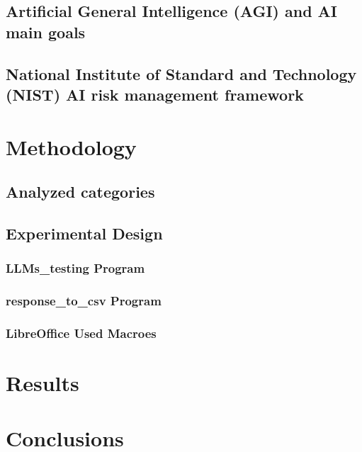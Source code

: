 \documentclass[12pt]{article}
\begin{document}
    \subsection{Artificial General Intelligence (AGI) and AI main goals}
    
    \subsection{National Institute of Standard and Technology (NIST) AI risk management framework}

\clearpage
\section{Methodology}
    \subsection{Analyzed categories}
    \subsection{Experimental Design}
        \subsubsection{LLMs\_testing Program}
        \subsubsection{response\_to\_csv Program}
        \subsubsection{LibreOffice Used Macroes}
        
\clearpage
\section{Results}

\clearpage
\section{Conclusions}

\clearpage
\printbibliography
\clearpage
\end{document}
